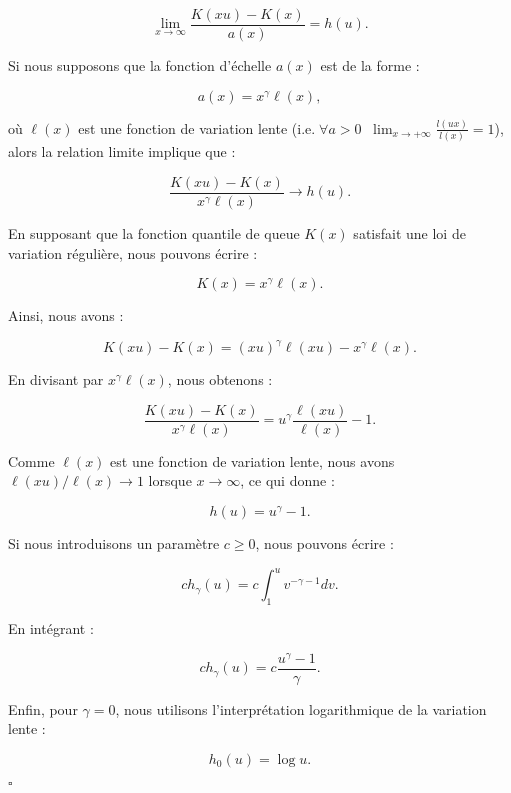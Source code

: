 \documentclass{article}
\begin{document}
\[
\lim_{x \to \infty} \frac{K(xu) - K(x)}{a(x)} = h (u).
\]

Si nous supposons que la fonction d'échelle \( a(x) \) est de la forme :

\[
a(x) = x^\gamma \ell(x),
\]

où \( \ell(x) \) est une fonction de variation lente ($\text{i.e.} \; \forall a > 0 \; \; \lim_{x \to + \infty} \frac{l(ux)}{l(x)}=1$), alors la relation limite implique que :

\[
\frac{K(xu) - K(x)}{x^\gamma \ell(x)} \to h (u).
\]

En supposant que la fonction quantile de queue \( K(x) \) satisfait une loi de variation régulière, nous pouvons écrire :

\[
K(x) = x^\gamma \ell(x).
\]

Ainsi, nous avons :

\[
K(xu) - K(x) = (xu)^\gamma \ell(xu) - x^\gamma \ell(x).
\]

En divisant par \( x^\gamma \ell(x) \), nous obtenons :

\[
\frac{K(xu) - K(x)}{x^\gamma \ell(x)} = u^\gamma \frac{\ell(xu)}{\ell(x)} - 1.
\]

Comme \( \ell(x) \) est une fonction de variation lente, nous avons \( \ell(xu)/\ell(x) \to 1 \) lorsque \( x \to \infty \), ce qui donne :

\[
h (u) = u^\gamma - 1.
\]

Si nous introduisons un paramètre \( c \geq 0 \), nous pouvons écrire :

\[
ch_\gamma (u) = c \int_1^u v^{-\gamma - 1} dv.
\]

En intégrant :

\[
ch_\gamma (u) = c \frac{u^\gamma - 1}{\gamma}.
\]

Enfin, pour \( \gamma = 0 \), nous utilisons l'interprétation logarithmique de la variation lente :

\[
h_0 (u) = \log u.
\]

\hfill\(\square\)
\end{document}
